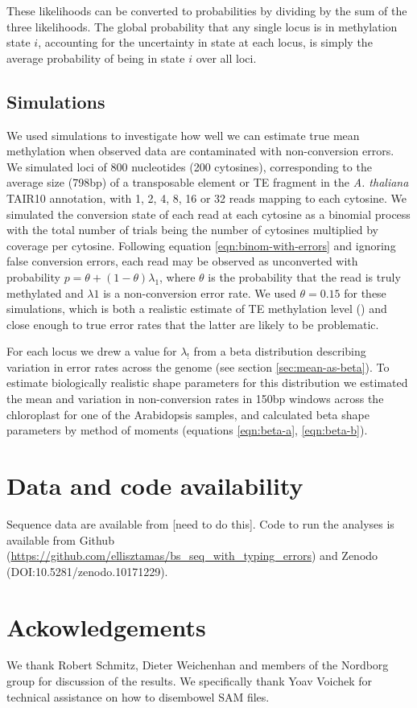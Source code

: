\documentclass[12pt,longbibliography]{article}
\begin{document}
These likelihoods can be converted to probabilities by dividing by the sum of the three likelihoods.
The global probability that any single locus is in methylation state $i$, accounting for the uncertainty in state at each locus, is simply the average probability of being in state $i$ over all loci.

\subsection{Simulations}

We used simulations to investigate how well we can estimate true mean methylation when observed data are contaminated with non-conversion errors.
We simulated loci of 800 nucleotides (200 cytosines), corresponding to the average size (798bp) of a transposable element or TE fragment in the \textit{A. thaliana} TAIR10 annotation, with 1, 2, 4, 8, 16 or 32 reads mapping to each cytosine.
We simulated the conversion state of each read at each cytosine as a binomial process with the total number of trials being the number of cytosines multiplied by coverage per cytosine.
Following equation \ref{eqn:binom-with-errors} and ignoring false conversion errors, each read may be observed as unconverted with probability $p=\theta + (1-\theta)\lambda_1$, where $\theta$ is the probability that the read is truly methylated and $\lambda1$ is a non-conversion error rate.
We used $\theta=0.15$ for these simulations, which is both a realistic estimate of TE methylation level (\cite{dubin2015dna}) and close enough to true error rates that the latter are likely to be problematic.

For each locus we drew a value for $\lambda_!$ from a beta distribution describing variation in error rates across the genome (see section \ref{sec:mean-as-beta}).
To estimate biologically realistic shape parameters for this distribution we estimated the mean and variation in non-conversion rates in 150bp windows across the chloroplast for one of the Arabidopsis samples, and calculated beta shape parameters by method of moments (equations \ref{eqn:beta-a}, \ref{eqn:beta-b}).

\section{Data and code availability}

Sequence data are available from [need to do this].
Code to run the analyses is available from Github (\url{https://github.com/ellisztamas/bs_seq_with_typing_errors}) and Zenodo (DOI:10.5281/zenodo.10171229).

\section{Ackowledgements}

We thank Robert Schmitz, Dieter Weichenhan and members of the Nordborg group for discussion of the results.
We specifically thank Yoav Voichek for technical assistance on how to disembowel SAM files.

\printbibliography %
\end{document}

